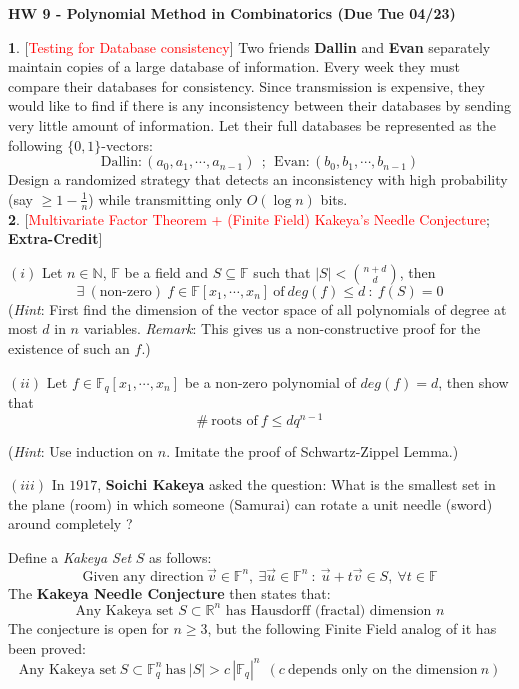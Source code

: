 \documentclass[10pt]{article}
\begin{document}
\begin{center}
\textbf{\Large{HW 9 - Polynomial Method in Combinatorics (Due Tue 04/23)}}
\end{center}
\medskip

\textbf{1}. [\textcolor{red}{Testing for Database consistency}] Two friends \textbf{Dallin} and \textbf{Evan} separately maintain copies of a large database of information. Every week they must compare their databases for consistency. Since transmission is expensive, they would like to find if there is any inconsistency between their databases by sending very little amount of information. Let their full databases be represented as the following $\{0,1\}$-vectors: $$\text{Dallin}: (a_0,a_1,\cdots, a_{n-1})~~;~~\text{Evan}: (b_0,b_1,\cdots, b_{n-1})$$ Design a randomized strategy that detects an inconsistency with high probability \big(say $\ge 1-\frac{1}{n}$\big) while transmitting only $O(\log n)$ bits.\\ %

\textbf{2}. [\textcolor{red}{Multivariate Factor Theorem + (Finite Field) Kakeya's Needle Conjecture}; \textbf{Extra-Credit}]\medskip

$(i)$ Let $n\in \mathbb{N}$, $\mathbb{F}$ be a field and $S\subseteq \mathbb{F}$ such that $|S|<\binom{n+d}{d}$, then $$\boxed{\exists~(\text{non-zero})~f\in \mathbb{F}[x_1,\cdots, x_n]~ \text{of}~ deg(f)\le d~:~ f(S)=0}$$ (\emph{Hint}: First find the dimension of the vector space of all polynomials of degree at most $d$ in $n$ variables. \emph{Remark}: This gives us a non-constructive proof for the existence of such an $f$.)\medskip

$(ii)$ Let $f\in \mathbb{F}_q[x_1,\cdots, x_n]$ be a non-zero polynomial of $deg(f)=d$, then show that $$\boxed{\#~ \text{roots of}~ f\le dq^{n-1}}$$

(\emph{Hint}: Use induction on $n$. Imitate the proof of Schwartz-Zippel Lemma.)\medskip

$(iii)$ In $1917$, \textbf{Soichi Kakeya} asked the question: What is the smallest set in the plane (room) in which someone (Samurai) can rotate a unit needle (sword) around completely ?\medskip

Define a \emph{Kakeya Set} $S$ as follows: $$\text{Given any direction}~ \overrightarrow{v}\in \mathbb{F}^n,~ \exists \overrightarrow{u}\in \mathbb{F}^n~:~\overrightarrow{u}+t\overrightarrow{v}\in S,~ \forall t\in \mathbb{F}$$ The \textbf{Kakeya Needle Conjecture} then states that: $$\boxed{\text{Any Kakeya set}\,\, S\subset \mathbb{R}^n\,\, \text{has Hausdorff (fractal) dimension}\,\, n}$$ The conjecture is open for $n\ge 3$, but the following Finite Field analog of it has been proved: $$\boxed{\text{Any Kakeya set}~ S\subset \mathbb{F}_q^n~ \text{has}~ |S|>c\,|\mathbb{F}_q|^n ~~ (c~\text{depends only on the dimension}~ n)}$$
\end{document}

